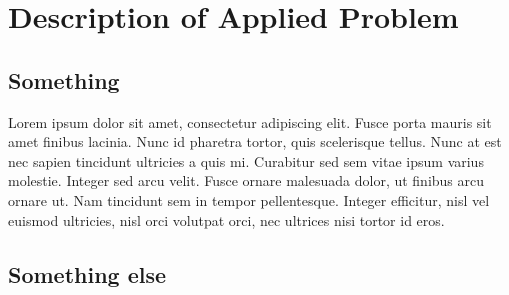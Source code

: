\documentclass{article}
\begin{document}


\begin{abstract} 
{\bf NOTE this is very important stuff!!} this is an example of an abstract.this is an example of an abstract.this
is an example of an abstract.this is an example of an abstract.this is
an example of an abstract.this is an example of an abstract.this is an
example of an abstract.this is an example of an abstract.this is an
example of an abstract.this is an example of an abstract.this is an
example of an abstract. \end{abstract} 


\section{Description of Applied
Problem}\label{description-of-applied-problem}

\subsection{Something}\label{something}

Lorem ipsum dolor sit amet, consectetur adipiscing elit. Fusce porta
mauris sit amet finibus lacinia. Nunc id pharetra tortor, quis
scelerisque tellus. Nunc at est nec sapien tincidunt ultricies a quis
mi. Curabitur sed sem vitae ipsum varius molestie. Integer sed arcu
velit. Fusce ornare malesuada dolor, ut finibus arcu ornare ut. Nam
tincidunt sem in tempor pellentesque. Integer efficitur, nisl vel
euismod ultricies, nisl orci volutpat orci, nec ultrices nisi tortor id
eros.

\subsection{Something else}\label{something-else}
\end{document}
